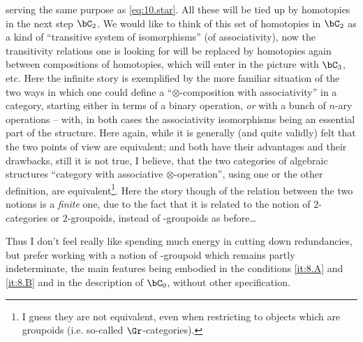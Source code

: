 serving the same purpose as \eqref{eq:10.star}. All these will be tied
up by homotopies in the next step $\bC_2$. We would like to think
of this set of homotopies in $\bC_2$ as a kind of ``transitive
system of isomorphisms'' (of associativity), now the transitivity
relations one is looking for will be replaced by homotopies again
between compositions of homotopies, which will enter in the picture
with $\bC_3$, etc. Here the infinite story is exemplified by the
more familiar situation of the two ways in which one could define a
``$\otimes$-composition with associativity'' in a category, starting
either in terms of a binary operation, \emph{or} with a bunch of $n$-ary
operations -- with, in both cases the associativity isomorphisms being
an essential part of the structure. Here again, while it is generally
(and quite validly) felt that the two points of view are equivalent;
and both have their advantages and their drawbacks, still it is not
true, I believe, that the two categories of algebraic structures
``category with associative $\otimes$-operation'', using one or the
other definition, are equivalent\footnote{I guess they are not equivalent, even when restricting to objects which are groupoids (i.e. so-called $\Gr$-categories).}. Here the story though of the relation between the two
notions is a \emph{finite} one, due to the fact that it is related to the
notion of $2$-categories or $2$-groupoids, instead of \oo-groupoids as
before\ldots

Thus I don't feel really like spending much energy in cutting down
redundancies, but prefer working with a notion of \oo-groupoid which
remains partly indeterminate, the main features being embodied in the
conditions \ref{it:8.A} and \ref{it:8.B} and in the description of
$\bC_0$, without other specification.


